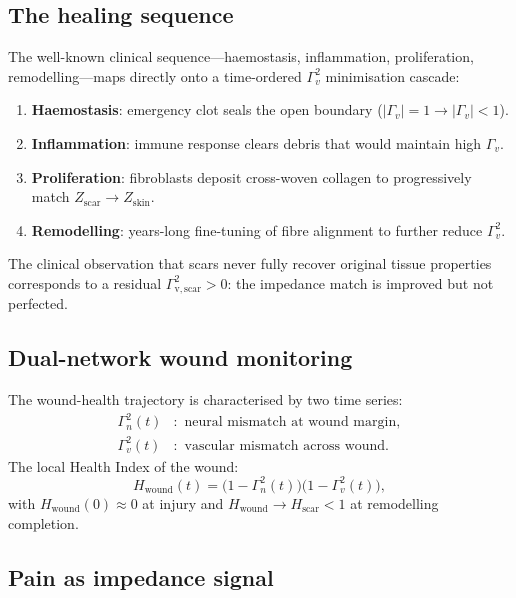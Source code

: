 \documentclass[aps,pre,twocolumn,superscriptaddress,floatfix]{revtex4-2}
\begin{document}
\subsection{The healing sequence}
\label{sec:healing}

The well-known clinical sequence---haemostasis,
inflammation, proliferation, remodelling---maps
directly onto a time-ordered $\Gamma_v^2$
minimisation cascade:
\begin{enumerate}
  \item \textbf{Haemostasis}: emergency clot seals the
    open boundary ($|\Gamma_v| = 1 \to
    |\Gamma_v| < 1$).
  \item \textbf{Inflammation}: immune response clears
    debris that would maintain high $\Gamma_v$.
  \item \textbf{Proliferation}: fibroblasts deposit
    cross-woven collagen to progressively match
    $Z_{\text{scar}} \to Z_{\text{skin}}$.
  \item \textbf{Remodelling}: years-long fine-tuning
    of fibre alignment to further reduce $\Gamma_v^2$.
\end{enumerate}

\noindent
The clinical observation that scars never fully
recover original tissue properties corresponds to a
residual
$\Gamma_{\mathrm{v},\text{scar}}^2 > 0$:
the impedance match is improved but not perfected.


\subsection{Dual-network wound monitoring}
\label{sec:wound-protocol}

The wound-health trajectory is characterised by two
time series:
\begin{align}
  \Gamma_n^2(t) &: \text{ neural mismatch at wound
    margin}, \\
  \Gamma_v^2(t) &: \text{ vascular mismatch across
    wound}.
\end{align}
The local Health Index of the wound:
\begin{equation}
  H_{\text{wound}}(t) =
    \bigl(1-\Gamma_n^2(t)\bigr)
    \bigl(1-\Gamma_v^2(t)\bigr),
  \label{eq:wound-health}
\end{equation}
with $H_{\text{wound}}(0) \approx 0$ at injury and
$H_{\text{wound}} \to H_{\text{scar}} < 1$ at
remodelling completion.


\subsection{Pain as impedance signal}
\label{sec:wound-pain}
\end{document}

